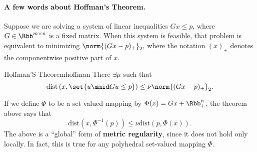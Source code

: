 \paragraph{A few words about Hoffman's Theorem.} Suppose we are solving a
system of linear inequalities $Gx \leq p$, where $G \in \Rbb^{m \times n}$ is a
fixed matrix. When this system is feasible, that problem is equivalent to
minimizing
\(
	\norm{(Gx - p)_+}_2,
\)
where the notation $(x)_+$ denotes the componentwise positive part of $x$.
\begin{ctheorem}{Hoffman'S Theorem}{hoffman}
	There $\exists \mu$ such that
	\[
		\mathrm{dist}\left(x, \set{u \mmid Gu \leq p}\right)
		\leq \nu \norm{(Gx - p)_+}_2.
	\]
\end{ctheorem}
If we define $\Phi$ to be a set valued mapping by $\Phi(x) = Gx + \Rbb_+^n$,
the theorem above says that
\[
	\mathrm{dist}\left(x, \Phi^{-1}(p)\right) \leq \nu \mathrm{dist}(p,
	\Phi(x)).
\]
The above is a ``global'' form of \textbf{metric regularity}, since it does not
hold only locally. In fact, this is true for any polyhedral set-valued mapping
$\Phi$.
